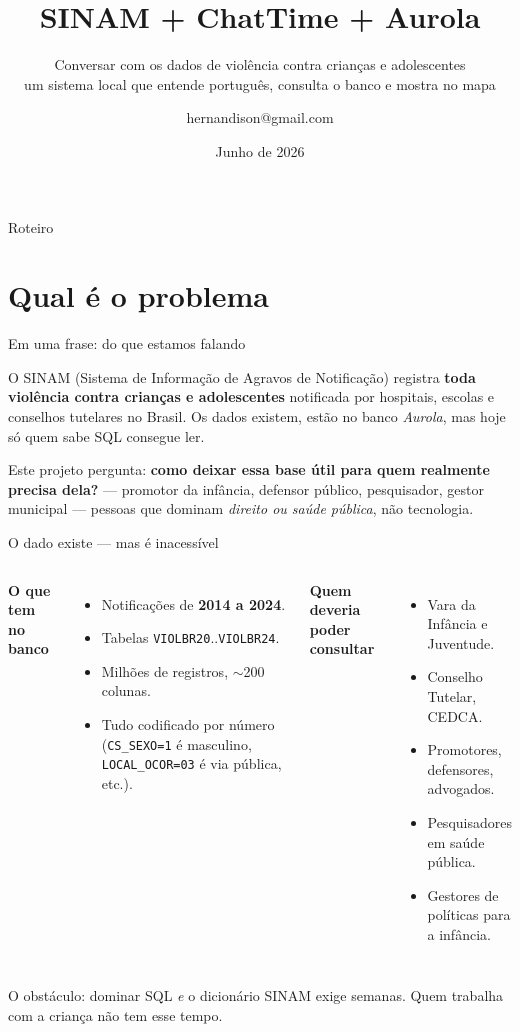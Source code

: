 \documentclass[10pt,aspectratio=169]{beamer}
\title{SINAM + ChatTime + Aurola}
\subtitle{Conversar com os dados de violência contra crianças e adolescentes\\
\textemdash{} um sistema local que entende português, consulta o banco e mostra no mapa}
\author{hernandison@gmail.com}
\institute{Projetos SINAM/VIOLBR e Aurola}
\date{Junho de 2026}
\newcommand{\code}[1]{\texttt{\small #1}}
\begin{document}
\maketitle

\begin{frame}{Roteiro}
\tableofcontents
\end{frame}

\section{Qual é o problema}

\begin{frame}{Em uma frase: do que estamos falando}
\begin{destaque}
O SINAM (Sistema de Informação de Agravos de Notificação) registra
\textbf{toda violência contra crianças e adolescentes} notificada por
hospitais, escolas e conselhos tutelares no Brasil. Os dados existem,
estão no banco \emph{Aurola}, mas hoje só quem sabe SQL consegue ler.
\end{destaque}

\vspace{0.8em}
Este projeto pergunta: \textbf{como deixar essa base útil para
quem realmente precisa dela?} --- promotor da infância, defensor
público, pesquisador, gestor municipal --- pessoas que dominam
\emph{direito ou saúde pública}, não tecnologia.
\end{frame}

\begin{frame}{O dado existe --- mas é inacessível}
\begin{columns}[T,onlytextwidth]
\textbf{O que tem no banco}
\begin{itemize}\small
\item Notificações de \textbf{2014 a 2024}.
\item Tabelas \code{VIOLBR20}..\code{VIOLBR24}.
\item Milhões de registros, $\sim$200 colunas.
\item Tudo codificado por número (\code{CS\_SEXO=1} é masculino,
\code{LOCAL\_OCOR=03} é via pública, etc.).
\end{itemize}

\textbf{Quem deveria poder consultar}
\begin{itemize}\small
\item Vara da Infância e Juventude.
\item Conselho Tutelar, CEDCA.
\item Promotores, defensores, advogados.
\item Pesquisadores em saúde pública.
\item Gestores de políticas para a infância.
\end{itemize}
\end{columns}

\vspace{0.7em}
\alert{O obstáculo: dominar SQL \emph{e} o dicionário SINAM exige
semanas. Quem trabalha com a criança não tem esse tempo.}
\end{frame}
\end{document}
